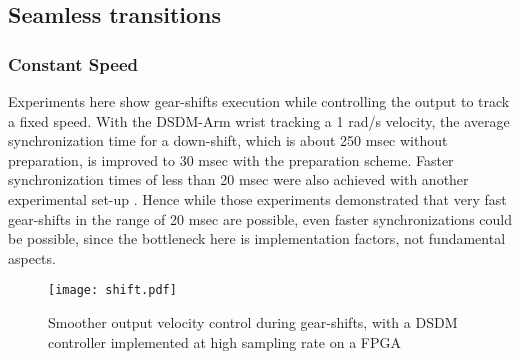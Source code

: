 \subsection{Seamless transitions}

\subsubsection{Constant Speed}
Experiments here show gear-shifts execution while controlling the output to track a fixed speed. With the DSDM-Arm wrist tracking a 1 rad/s velocity, the average synchronization time for a down-shift, which is about 250 msec without preparation, is improved to 30 msec with the preparation scheme. Faster synchronization times of less than 20 msec were also achieved with another experimental set-up \cite{girard_two-speed_2015}. Hence while those experiments demonstrated that very fast gear-shifts in the range of 20 msec are possible, even faster synchronizations could be possible, since the bottleneck here is implementation factors, not fundamental aspects. 

\begin{figure}[t]
	\centering
		\texttt{[image: shift.pdf]}
	\caption[Smoother output velocity control during gear-shifts]{Smoother output velocity control during gear-shifts, with a DSDM controller implemented at high sampling rate on a FPGA}
	\label{fig:shifts}
\end{figure}

